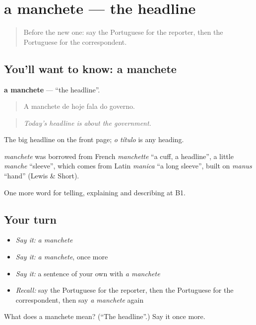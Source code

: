\section[a manchete]{a manchete — the headline}

\label{lesson:PT-C279-manchete}



\begin{quote}
Before the new one: say the Portuguese for the reporter, then the Portuguese for the correspondent.
\end{quote}

\subsection*{You'll want to know: a manchete}
\textbf{a manchete} — \textquotedblleft{}the headline\textquotedblright{}.

\begin{quote}
A manchete de hoje fala do governo.
\end{quote}

\begin{quote}
\emph{Today’s headline is about the government.}
\end{quote}

The big headline on the front page; \emph{o título} is any heading.

\begin{cousinweb}
\emph{manchete} was borrowed from French \emph{manchette} \textquotedblleft{}a cuff, a headline\textquotedblright{}, a little \emph{manche} \textquotedblleft{}sleeve\textquotedblright{}, which comes from Latin \emph{manica} \textquotedblleft{}a long sleeve\textquotedblright{}, built on \emph{manus} \textquotedblleft{}hand\textquotedblright{} (Lewis \& Short).
\end{cousinweb}

\begin{grammarlens}[title={What you've built}]
One more word for telling, explaining and describing at B1.
\end{grammarlens}

\subsection*{Your turn}
\begin{itemize}
\raggedright
  \item \emph{Say it:} \emph{a manchete}
  \item \emph{Say it:} \emph{a manchete}, once more
  \item \emph{Say it:} a sentence of your own with \emph{a manchete}
  \item \emph{Recall:} say the Portuguese for the reporter, then the Portuguese for the correspondent, then say \emph{a manchete} again
\end{itemize}

\begin{tcolorbox}[breakable,colback=teal!4,colframe=teal!35!black,title={Before you move on}]
What does a manchete mean? (\textquotedblleft{}The headline\textquotedblright{}.) Say it once more.
\end{tcolorbox}

